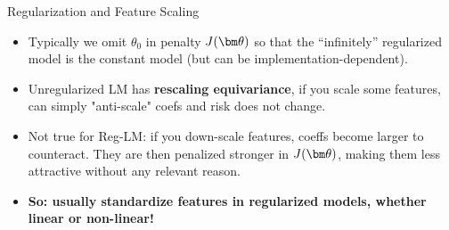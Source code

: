 \documentclass[11pt,compress,t,notes=noshow, xcolor=table]{beamer}
\begin{document}
\begin{vbframe}{Regularization and Feature Scaling}

  \begin{itemize}
    \item Typically we omit $\theta_0$ in penalty $J(\thetav)$ so that the ``infinitely'' regularized model is the constant model (but can be implementation-dependent).
    \item Unregularized LM has \textbf{rescaling equivariance}, if you scale some features, can simply "anti-scale" coefs and risk does not change.
    \item Not true for Reg-LM: if you down-scale features, coeffs become larger to counteract. They are then penalized stronger in $J(\thetav)$, making them less attractive without any relevant reason.
    \item \textbf{So: usually standardize features in regularized models, whether linear or non-linear!}  
      
  \end{itemize}

\framebreak



\end{vbframe}
\end{document}
